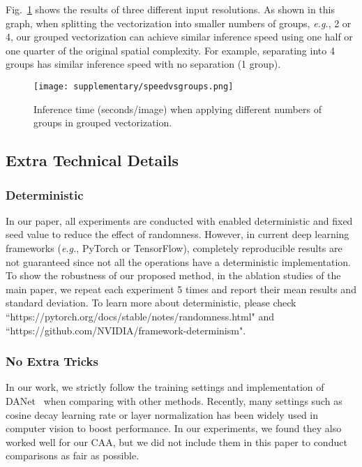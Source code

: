 \documentclass[letterpaper]{article} \usepackage{aaai22}  \usepackage{times}  \usepackage{helvet}  \usepackage{courier}  \usepackage[hyphens]{url}  \usepackage{graphicx} \urlstyle{rm} \def\UrlFont{\rm}  \usepackage{natbib}  \usepackage{caption} \DeclareCaptionStyle{ruled}{labelfont=normalfont,labelsep=colon,strut=off} \frenchspacing  \setlength{\pdfpagewidth}{8.5in}  \setlength{\pdfpageheight}{11in}  \usepackage{algorithm}
\begin{document}
Fig.~\ref{figSpeedVSGroups} shows the results of three different input resolutions. 
As shown in this graph, when splitting the vectorization into smaller numbers of groups, \textit{e.g.}, 2 or 4, our grouped vectorization can achieve similar inference speed using one half or one quarter of the original spatial complexity. 
For example, separating into 4 groups has similar inference speed with no separation (1 group).


\begin{figure}[t]
	\centering
	\texttt{[image: supplementary/speedvsgroups.png]}
	\caption{Inference time (seconds/image) when applying different numbers of groups in grouped vectorization.}
\label{figSpeedVSGroups}
\end{figure}

\subsection{Extra Technical Details}

\subsubsection{Deterministic}
In our paper, all experiments are conducted with enabled deterministic and fixed seed value to reduce the effect of randomness. 
However, in current deep learning frameworks (\textit{e.g.}, PyTorch or TensorFlow), completely reproducible results are not guaranteed since not all the operations have a deterministic implementation. 
To show the robustness of our proposed method, in the ablation studies of the main paper, we repeat each experiment 5 times and report their mean results and standard deviation. 
To learn more about deterministic, please check ``https://pytorch.org/docs/stable/notes/randomness.html" and ``https://github.com/NVIDIA/framework-determinism".

\subsubsection{No Extra Tricks}
In our work, we strictly follow the training settings and implementation of DANet~\cite{cDualAttention} when comparing with other methods. 
Recently, many settings such as cosine decay learning rate or layer normalization has been widely used in computer vision to boost performance. 
In our experiments, we found they also worked well for our CAA, but we did not include them in this paper to conduct comparisons as fair as possible.
\end{document}
